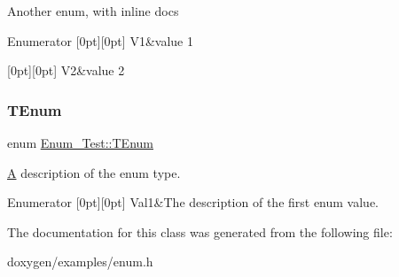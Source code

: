 Another enum, with inline docs \begin{DoxyEnumFields}{Enumerator}
[0pt][0pt]{}\mbox{\label{class_enum___test_a633286511e19b996e97699d7dd2cd2a0ab0e5fe049a18d196b564c00bb241722f}} 
V1&value 1 \\
\hline

[0pt][0pt]{}\mbox{\label{class_enum___test_a633286511e19b996e97699d7dd2cd2a0ae83b4255ceeedf0c49dd65d1eff8b750}} 
V2&value 2 \\
\hline

\end{DoxyEnumFields}
\mbox{\label{class_enum___test_a8d096bc026dbb395991f02e3ca86eb1c}} 
\subsubsection{\texorpdfstring{TEnum}{TEnum}}
{\footnotesize\ttfamily enum \mbox{\hyperlink{class_enum___test_a8d096bc026dbb395991f02e3ca86eb1c}{Enum\+\_\+\+Test\+::\+T\+Enum}}}

\mbox{\hyperlink{class_a}{A}} description of the enum type. \begin{DoxyEnumFields}{Enumerator}
[0pt][0pt]{}\mbox{\label{class_enum___test_a8d096bc026dbb395991f02e3ca86eb1ca88efe763d7807db8a48f6e685277d7fd}} 
Val1&The description of the first enum value. \\
\hline

\end{DoxyEnumFields}


The documentation for this class was generated from the following file\+:\begin{DoxyCompactItemize}
\item 
doxygen/examples/enum.\+h\end{DoxyCompactItemize}
